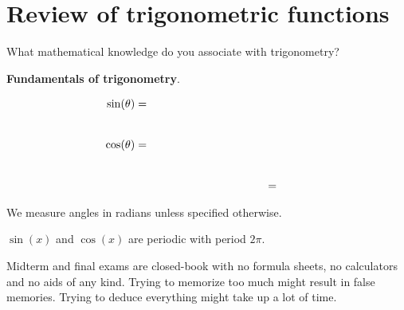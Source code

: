 \documentclass[../main.tex]{subfiles}
\begin{document}
 \section{Review of trigonometric functions}
\faComments{} What mathematical knowledge do you associate with trigonometry?


\begin{mdframed}[style=simple-compact]
  \textbf{Fundamentals of trigonometry}.

  \begin{minipage}{0.45\textwidth}
    
  \end{minipage}
  \begin{minipage}{0.55\textwidth}
    \begin{align}
      \label{eq:sin}
      \sin(\theta) = \hspace{2in} \\[5ex]
      \label{eq:cos}
      \cos(\theta) = \hspace{2in} \\[5ex]
      \label{eq:trig-pythagorean}
      \hspace{1.5in} = \hspace{1cm}
    \end{align}
  \end{minipage}

  \bigskip
  We measure angles in radians unless specified otherwise.
  \begin{center}
    
    
  \end{center}

  \bigskip
  \(\sin(x)\) and \(\cos(x)\) are periodic with period \(2\pi\).

  \begin{center}
    

    
  \end{center}
\end{mdframed}
\clearpage

\faExclamationTriangle{}
Midterm and final exams are closed-book with no formula sheets, no calculators and no aids of any kind.  Trying to memorize too much might result in false memories.  Trying to deduce everything might take up a lot of time.  
\end{document}
